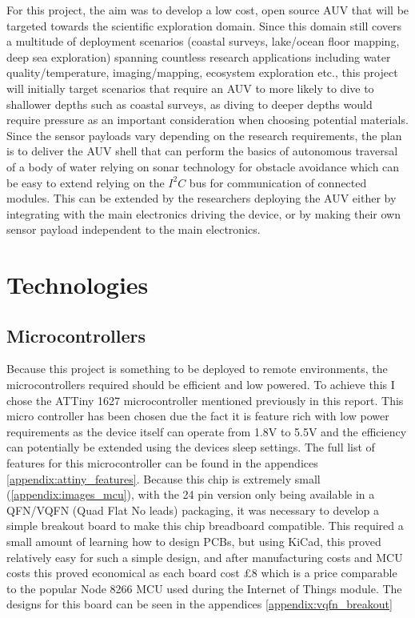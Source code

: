\documentclass[11pt,a4paper,titlepage]{report}
\begin{document}
	For this project, the aim was to develop a low cost, open source AUV that will be targeted towards the scientific exploration domain. Since this domain still covers a multitude of deployment scenarios (coastal surveys, lake/ocean floor mapping, deep sea exploration) spanning countless research applications including water quality/temperature, imaging/mapping, ecosystem exploration etc., this project will initially target scenarios that require an AUV to more likely to dive to shallower depths such as coastal surveys, as diving to deeper depths would require pressure as an important consideration when choosing potential materials. Since the sensor payloads vary depending on the research requirements, the plan is to deliver the AUV shell that can perform the basics of autonomous traversal of a body of water relying on sonar technology for obstacle avoidance which can be easy to extend relying on the $I^{2}C$ bus for communication of connected modules. This can be extended by the researchers deploying the AUV either by integrating with the main electronics driving the device, or by making their own sensor payload independent to the main electronics. 
	
	\section*{Technologies}
	\subsection*{Microcontrollers}
	Because this project is something to be deployed to remote environments, the microcontrollers required should be efficient and low powered. To achieve this I chose the ATTiny 1627 microcontroller mentioned previously in this report. This micro controller has been chosen due the fact it is feature rich with low power requirements as the device itself can operate from 1.8\unit{\volt} to 5.5\unit{\volt} and the efficiency can potentially be extended using the devices sleep settings. The full list of features for this microcontroller can be found in the appendices \ref{appendix:attiny_features}. Because this chip is extremely small (\ref{appendix:images_mcu}), with the 24 pin version only being available in a QFN/VQFN (Quad Flat No leads) packaging, it was necessary to develop a simple breakout board to make this chip breadboard compatible. This required a small amount of learning how to design PCBs, but using KiCad\cite{KICAD}, this proved relatively easy for such a simple design, and after manufacturing costs and MCU costs this proved economical as each board cost \unit{\approx}£8 which is a price comparable to the popular Node 8266 MCU used during the Internet of Things module. The designs for this board can be seen in the appendices \ref{appendix:vqfn_breakout}
	
\end{document}
